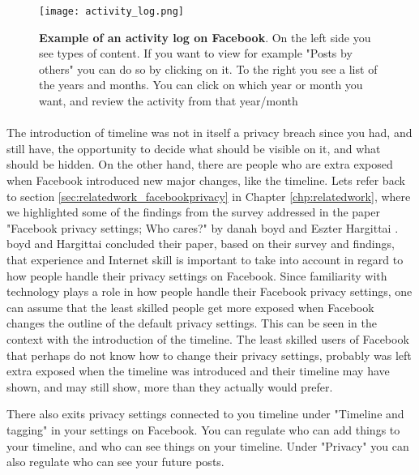 \begin{figure}[h!]
\centering
\texttt{[image: activity\_log.png]}
\caption [Example of an activity log on Facebook.]{\textbf{Example of an activity log on Facebook}. On the left side you see types of content. If you want to view for example "Posts by others" you can do so by clicking on it. To the right you see a list of the years and months. You can click on which year or month you want, and review the activity from that year/month \cite{activitylog}} 
\label{fig:activitylog}
\end{figure}

\paragraph{}
The introduction of timeline was not in itself a privacy breach since you had, and still have, the opportunity to decide what should be visible on it, and what should be hidden. On the other hand, there are people who are extra exposed when Facebook introduced new major changes, like the timeline. Lets refer back to section \ref{sec:relatedwork_facebookprivacy} in Chapter \ref{chp:relatedwork}, where we highlighted some of the findings from the survey addressed in the paper "Facebook privacy settings; Who cares?" by danah boyd and Eszter Hargittai \cite{whocares}. boyd and Hargittai concluded their paper, based on their survey and findings, that experience and Internet skill is important to take into account in regard to how people handle their privacy settings on Facebook. Since familiarity with technology plays a role in how people handle their Facebook privacy settings, one can assume that the least skilled people get more exposed when Facebook changes the outline of the default privacy settings. 
This can be seen in the context with the introduction of the timeline. The least skilled users of Facebook that perhaps do not know how to change their privacy settings, probably was left extra exposed when the timeline was introduced and their timeline may have shown, and may still show, more than they actually would prefer. 

There also exits privacy settings connected to you timeline under "Timeline and tagging" in your settings on Facebook. You can regulate who can add things to your timeline, and who can see things on your timeline. Under "Privacy" you can also regulate who can see your future posts. 


